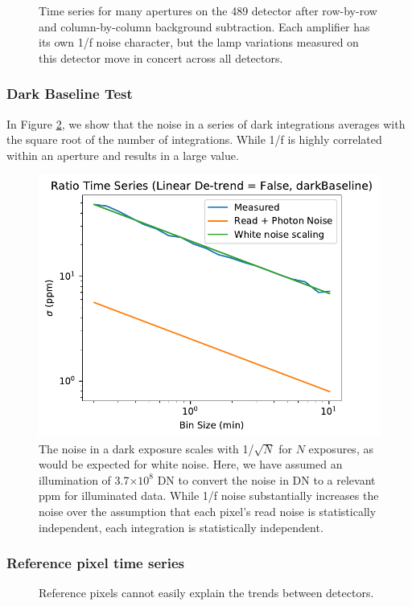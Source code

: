 \documentclass{aastex62}
\begin{document}
{\begin{figure}
{}
{}
\caption{Time series for many apertures on the 489 detector after row-by-row and column-by-column background subtraction.
Each amplifier has its own 1/f noise character, but the lamp variations measured on this detector move in concert across all detectors.}\label{fig:manyApOn489}
\end{figure}



\clearpage
\subsubsection{Dark Baseline Test}\label{sec:darkBaseline}
In Figure \ref{fig:darkBaselineAllan}, we show that the noise in a series of dark integrations averages with the square root of the number of integrations.
While 1/f is highly correlated within an aperture and results in a large value.

\begin{figure}[!hbtp]
\centering
\includegraphics[width=.4\columnwidth]{allan_var_removelinear_False_darkBaseline.pdf}
\caption{The noise in a dark exposure scales with 1/$\sqrt{N}$ for $N$ exposures, as would be expected for white noise.
Here, we have assumed an illumination of 3.7$\times10^8$ DN to convert the noise in DN to a relevant ppm for illuminated data.
While 1/f noise substantially increases the noise over the assumption that each pixel's read noise is statistically independent, each integration is statistically independent.
}\label{fig:darkBaselineAllan}
\end{figure}

\clearpage
\subsubsection{Reference pixel time series}
\begin{figure}
{}
\caption{Reference pixels cannot easily explain the trends between detectors.}\label{fig:refpixTSeries}
\end{figure}

}
\end{document}
